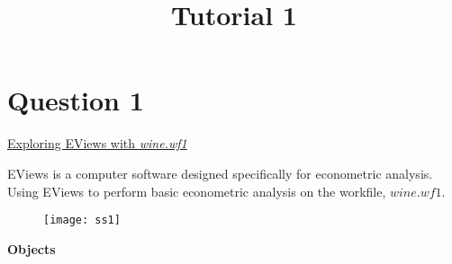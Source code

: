 \documentclass[12pt]{report}
\title{Tutorial 1}
\subtitle
{
	\textbf{keywords}: EViews, variables, data set, sample, population, descriptive analytics, summary statistics, histogram, scatter plots, correlation, simple linear regression model, predictive analytics

}
\begin{document}
	
	\maketitle

	\section*{Question 1}
	\underline{Exploring EViews with \textit{wine.wf1}}
	
	\noindent EViews is a computer software designed specifically for econometric analysis. Using EViews to perform basic econometric analysis on the workfile, $wine.wf1$.
		\begin{figure}[H]
			\centering
			\texttt{[image: ss1]}
		\end{figure}
		\vspace{-\baselineskip}
		\noindent \textbf{Objects}
		
\end{document}
